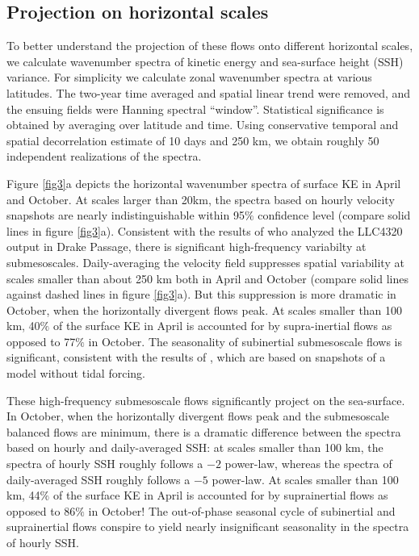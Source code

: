 \documentclass[grl]{agutex2015}
\begin{document}
\begin{article}
\section{Projection on horizontal scales}

To better understand the projection of these flows onto different horizontal
scales, we calculate wavenumber spectra of kinetic energy and sea-surface height
(SSH) variance. For simplicity we calculate zonal wavenumber spectra at various
latitudes. The two-year time averaged and spatial linear trend were
removed, and the ensuing fields were Hanning spectral ``window''. Statistical significance
is obtained by averaging over latitude and time. Using conservative temporal and
spatial decorrelation estimate of 10 days and 250 km, we obtain roughly 50
independent realizations of the spectra.

Figure \ref{fig3}a depicts the horizontal wavenumber spectra of surface KE in
April and October. At scales larger than 20km, the spectra based on hourly
velocity snapshots are nearly indistinguishable within 95$\%$ confidence level
(compare solid lines in figure \ref{fig3}a). Consistent with the results of
\citet{rocha_etal2016} who analyzed the LLC4320 output in Drake Passage,
there is significant high-frequency variabilty at submesoscales. Daily-averaging
the velocity field suppresses spatial variability at scales smaller than about 250
km both in April and October (compare solid lines against dashed lines in figure
\ref{fig3}a). But this suppression is more dramatic in October, when the horizontally
divergent flows peak. At scales
smaller than 100 km, 40$\%$ of the surface KE in April is accounted for by supra-inertial
flows as opposed to 77$\%$ in October. The seasonality of subinertial submesoscale flows
is significant, consistent with the results of \citet{sasaki_etal2014}, which are
based on snapshots of a model without tidal forcing.

These high-frequency submesoscale flows significantly project on the sea-surface.
In October, when the horizontally divergent flows peak and the submesoscale
balanced flows are minimum, there is a dramatic difference between the spectra
based on hourly and daily-averaged SSH: at scales smaller than 100 km, the spectra
of hourly SSH roughly follows a $-2$ power-law, whereas the spectra of daily-averaged
SSH roughly follows a $-5$ power-law. At scales
smaller than 100 km, 44$\%$ of the surface KE in April is accounted for by suprainertial
flows as opposed to 86$\%$ in October! The out-of-phase seasonal cycle of subinertial
and suprainertial flows conspire to yield nearly insignificant seasonality in the spectra
of hourly SSH.


\end{article}
\end{document}
